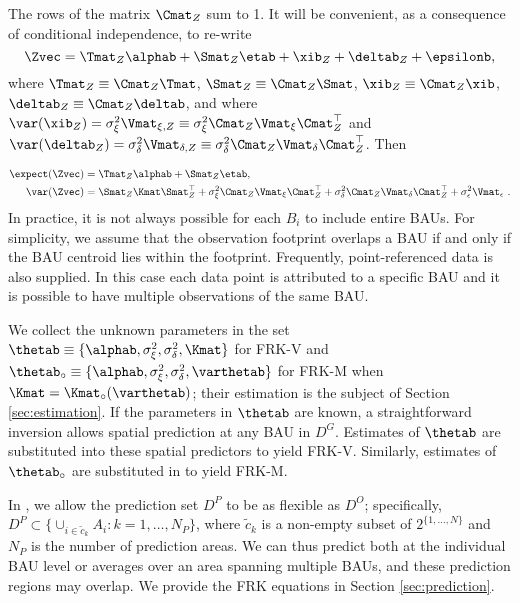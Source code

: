 

The rows of  the matrix $\Cmat_Z$ sum to 1. It will be convenient, as a consequence of conditional independence, to re-write
\begin{equation}\label{eq:Z_collapsed}
\Zvec = \Tmat_Z\alphab + \Smat_Z\etab + \xib_Z + \deltab_Z + \epsilonb,
\end{equation}
where $\Tmat_Z \equiv \Cmat_Z \Tmat$, $\Smat_Z \equiv \Cmat_Z \Smat$, $\xib_Z \equiv \Cmat_Z \xib$, $\deltab_Z \equiv \Cmat_Z \deltab$, and where $\var(\xib_Z) = \sigma^2_\xi\Vmat_{\xi,Z} \equiv \sigma^2_\xi\Cmat_Z\Vmat_{\xi}\Cmat_Z^\top$ and $\var(\deltab_Z) = \sigma^2_\delta\Vmat_{\delta,Z} \equiv \sigma^2_\delta\Cmat_Z\Vmat_\delta\Cmat_Z^\top$. Then

\begin{align*}
\expect(\Zvec) &=\Tmat_Z\alphab + \Smat_Z\etab,\\
\var(\Zvec) &= \Smat_Z\Kmat\Smat_Z^\top + \sigma^2_\xi\Cmat_Z\Vmat_{\xi}\Cmat_Z^\top +  \sigma^2_\delta\Cmat_Z\Vmat_\delta\Cmat_Z^\top + \sigma^2_\epsilon\Vmat_\epsilon~.
\end{align*}
In practice, it is not always possible for each $B_i$ to include entire BAUs. For simplicity, we assume that the observation footprint overlaps a BAU if and only if the BAU centroid lies within the footprint. Frequently, point-referenced data is also supplied. In this case each data point is attributed to a specific BAU and it is possible to have multiple observations of the same BAU.


We collect the unknown parameters in the set $\thetab \equiv \{\alphab, \sigma^2_\xi, \sigma^2_\delta, \Kmat\}$ for FRK-V and $\thetab_\circ \equiv \{\alphab, \sigma^2_\xi, \sigma^2_\delta, \varthetab\}$ for FRK-M when $\Kmat = \Kmat_\circ(\varthetab)$; their estimation is the subject of Section \ref{sec:estimation}. If the parameters in $\thetab$ are known, a straightforward inversion allows spatial prediction at any BAU in $D^G$. Estimates of $\thetab$ are substituted into these spatial predictors to yield FRK-V. Similarly, estimates of $\thetab_\circ$ are substituted in to yield FRK-M.

In , we allow the prediction set $D^P$ to be as flexible as $D^O$; specifically, $D^P \subset \{ \cup_{i \in \tilde{c}_k} A_i : k = 1,\dots,N_P \}$, where $\tilde{c}_k$ is a non-empty subset of $2^{\{1,\dots,N\}}$ and $N_P$ is the number of prediction areas. We can thus predict both at the individual BAU level or averages over an area spanning multiple BAUs, and these prediction regions may overlap. We provide the FRK equations in Section \ref{sec:prediction}.

